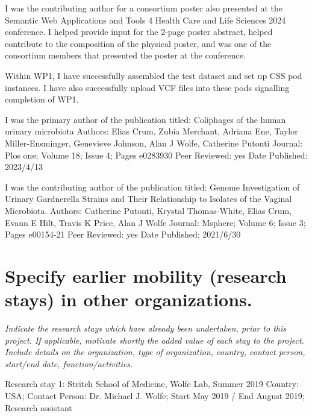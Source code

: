 {I was the contributing author for a consortium poster also presented at the Semantic Web Applications and Tools 4 Health Care and Life Sciences 2024 conference. I helped provide input for the 2-page poster abstract, helped contribute to the composition of the physical poster, and was one of the consortium members that presented the poster at the conference.

Within WP1, I have successfully assembled the test dataset and set up CSS pod instances.
I have also successfully upload VCF files into these pods signalling completion of WP1. 


I was the primary author of the publication titled: Coliphages of the human urinary microbiota
Authors: Elias Crum, Zubia Merchant, Adriana Ene, Taylor Miller-Ensminger, Genevieve Johnson, Alan J Wolfe, Catherine Putonti
Journal: Plos one; Volume 18; Issue 4; Pages e0283930
Peer Reviewed: yes
Date Published: 2023/4/13

I was the contributing author of the publication titled: Genome Investigation of Urinary Gardnerella Strains and Their Relationship to Isolates of the Vaginal Microbiota.
Authors: Catherine Putonti, Krystal Thomas-White, Elias Crum, Evann E Hilt, Travis K Price, Alan J Wolfe
Journal: Msphere; Volume 6; Issue 3; Pages e00154-21
Peer Reviewed: yes
Date Published: 2021/6/30


\section{Specify earlier mobility (research stays) in other organizations.}
\textit{
Indicate the research stays which have already been undertaken, prior to this project. 
If applicable, motivate shortly the added value of each stay to the project. 
Include details on the organization, type of organization, country, contact person, start/end date, function/activities.
}

Research stay 1: Stritch School of Medicine, Wolfe Lab, Summer 2019
Country: USA; Contact Person: Dr. Michael J. Wolfe; Start May 2019 / End August 2019; Research assistant

}
